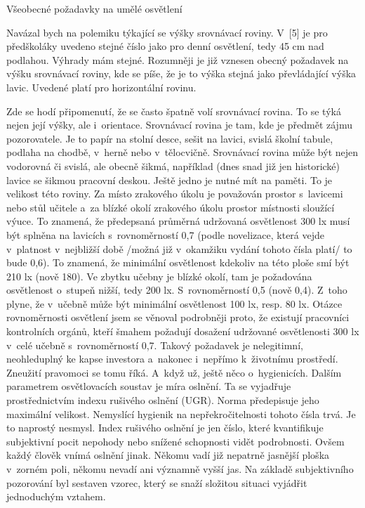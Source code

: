 \chap Všeobecné požadavky na umělé osvětlení

Navázal bych na polemiku týkající se výšky srovnávací roviny. V~[5] je pro předškoláky uvedeno stejné číslo
jako pro denní osvětlení, tedy 45 cm nad podlahou. Výhrady mám stejné. Rozumněji je již vznesen obecný
požadavek na výšku srovnávací roviny, kde se píše, že je to výška stejná jako převládající výška lavic.
Uvedené platí pro horizontální rovinu.

\medskip
Zde se hodí připomenutí, že se často špatně volí srovnávací rovina. To se týká nejen její výšky,
ale i~orientace. Srovnávací rovina je tam, kde je předmět zájmu pozorovatele. Je to papír na stolní
desce, sešit na lavici, svislá školní tabule, podlaha na chodbě, v~herně nebo v~tělocvičně.
Srovnávací rovina může být nejen vodorovná či svislá, ale obecně šikmá, například (dnes snad již jen historické)
 lavice se šikmou pracovní deskou.
\medskip
Ještě jedno je nutné mít na paměti. To je velikost této roviny. Za místo zrakového úkolu je považován prostor
s~lavicemi nebo stůl učitele a~za blízké okolí zrakového úkolu prostor místnosti sloužící výuce.
To znamená, že předepsaná průměrná udržovaná osvětlenost 300 lx musí být splněna na lavicích s~rovnoměrností 0,7
(podle novelizace, která vejde v~platnost v~nejbližší době /možná již v~okamžiku vydání tohoto čísla platí/ to bude 0,6).
 To znamená, že minimální osvětlenost kdekoliv na této ploše smí být 210 lx (nově 180).
 Ve zbytku učebny je blízké okolí, tam je požadována osvětlenost o~stupeň nižší, tedy 200 lx.
 S~rovnoměrností 0,5 (nově 0,4). Z~toho plyne, že v~učebně může být minimální osvětlenost 100 lx, resp. 80 lx.
 Otázce rovnoměrnosti osvětlení jsem se věnoval podrobněji proto, že existují pracovníci kontrolních orgánů,
 kteří šmahem požadují dosažení udržované osvětlenosti 300 lx v~celé učebně s~rovnoměrností 0,7.
 Takový požadavek je nelegitimní, neohleduplný ke kapse investora a~nakonec i~nepřímo k~životnímu prostředí.
 Zneužití pravomoci se tomu říká.
\medskip
A~když už, ještě něco o~hygienicích. Dalším parametrem osvětlovacích soustav je míra oslnění.
Ta se vyjadřuje prostřednictvím indexu rušivého oslnění (UGR). Norma předepisuje jeho maximální velikost.
Nemyslící hygienik na nepřekročitelnosti tohoto čísla trvá. Je to naprostý nesmysl.
Index rušivého oslnění je jen číslo, které kvantifikuje subjektivní pocit nepohody nebo snížené
schopnosti vidět podrobnosti. Ovšem každý člověk vnímá oslnění jinak. Někomu vadí již nepatrně
jasnější ploška v~zorném poli, někomu nevadí ani významně vyšší jas. Na základě subjektivního
pozorování byl sestaven vzorec, který se snaží složitou situaci vyjádřit jednoduchým vztahem.
